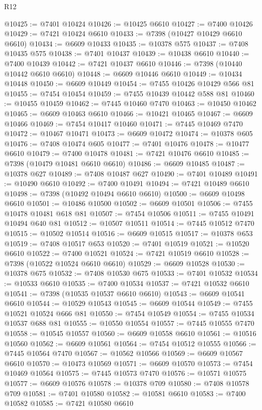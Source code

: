 \begin{lexlean}{R12}
\begin{coremodule}
{{{{{{{{{{{{{{{{{{{{{{{{{{{{{{{{{{{{{{{{{{{{{{{{{{{{{{{{{{{{{{{{{{{{{{{{{{{{{{{{{{@10425 := @7401 @10424
@10426 := @10425 @6610
@10427 := @7400 @10426
@10429 := @7421 @10424 @6610
@10433 := @7398 (@10427 @10429 @6610 @6610)
@10434 := @6609 @10433
@10435 := @10378 @575
@10437 := @7408 @10435 @575
@10438 := @7401 @10437
@10439 := @10438 @6610
@10440 := @7400 @10439
@10442 := @7421 @10437 @6610
@10446 := @7398 (@10440 @10442 @6610 @6610)
@10448 := @6609 @10446 @6610
@10449 := @10434 @10448
@10450 := @6609 @10449
@10454 := @7455 @10426 @10429 @566 @81
@10455 := @7454 @10454
@10459 := @7455 @10439 @10442 @588 @81
@10460 := @10455 @10459
@10462 := @7445 @10460 @7470
@10463 := @10450 @10462
@10465 := @6609 @10463 @6610
@10466 := @10421 @10465
@10467 := @6609 @10466
@10469 := @7454 @10417 @10460
@10471 := @7445 @10469 @7470
@10472 := @10467 @10471
@10473 := @6609 @10472
@10474 := @10378 @605
@10476 := @7408 @10474 @605
@10477 := @7401 @10476
@10478 := @10477 @6610
@10479 := @7400 @10478
@10481 := @7421 @10476 @6610
@10485 := @7398 (@10479 @10481 @6610 @6610)
@10486 := @6609 @10485
@10487 := @10378 @627
@10489 := @7408 @10487 @627
@10490 := @7401 @10489
@10491 := @10490 @6610
@10492 := @7400 @10491
@10494 := @7421 @10489 @6610
@10498 := @7398 (@10492 @10494 @6610 @6610)
@10500 := @6609 @10498 @6610
@10501 := @10486 @10500
@10502 := @6609 @10501
@10506 := @7455 @10478 @10481 @618 @81
@10507 := @7454 @10506
@10511 := @7455 @10491 @10494 @640 @81
@10512 := @10507 @10511
@10514 := @7445 @10512 @7470
@10515 := @10502 @10514
@10516 := @6609 @10515
@10517 := @10378 @653
@10519 := @7408 @10517 @653
@10520 := @7401 @10519
@10521 := @10520 @6610
@10522 := @7400 @10521
@10524 := @7421 @10519 @6610
@10528 := @7398 (@10522 @10524 @6610 @6610)
@10529 := @6609 @10528
@10530 := @10378 @675
@10532 := @7408 @10530 @675
@10533 := @7401 @10532
@10534 := @10533 @6610
@10535 := @7400 @10534
@10537 := @7421 @10532 @6610
@10541 := @7398 (@10535 @10537 @6610 @6610)
@10543 := @6609 @10541 @6610
@10544 := @10529 @10543
@10545 := @6609 @10544
@10549 := @7455 @10521 @10524 @666 @81
@10550 := @7454 @10549
@10554 := @7455 @10534 @10537 @688 @81
@10555 := @10550 @10554
@10557 := @7445 @10555 @7470
@10558 := @10545 @10557
@10560 := @6609 @10558 @6610
@10561 := @10516 @10560
@10562 := @6609 @10561
@10564 := @7454 @10512 @10555
@10566 := @7445 @10564 @7470
@10567 := @10562 @10566
@10569 := @6609 @10567 @6610
@10570 := @10473 @10569
@10571 := @6609 @10570
@10573 := @7454 @10469 @10564
@10575 := @7445 @10573 @7470
@10576 := @10571 @10575
@10577 := @6609 @10576
@10578 := @10378 @709
@10580 := @7408 @10578 @709
@10581 := @7401 @10580
@10582 := @10581 @6610
@10583 := @7400 @10582
@10585 := @7421 @10580 @6610
}}}}}}}}}}}}}}}}}}}}}}}}}}}}}}}}}}}}}}}}}}}}}}}}}}}}}}}}}}}}}}}}}}}}}}}}}}}}}}}}}}
\end{coremodule}
\end{lexlean}
